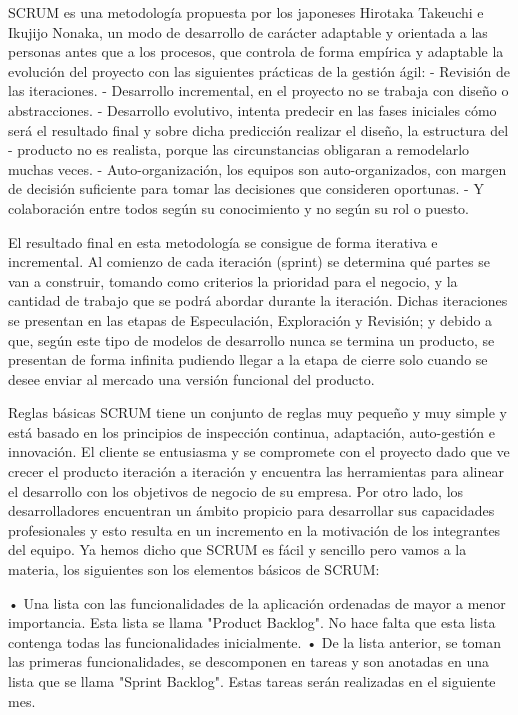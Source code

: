 SCRUM es una metodología propuesta por los japoneses Hirotaka Takeuchi e Ikujijo Nonaka, un modo de desarrollo de carácter adaptable y orientada a las personas antes
que a los procesos, que controla de forma empírica y adaptable la evolución del proyecto con las siguientes prácticas de la gestión ágil:
       - Revisión de las iteraciones.
       - Desarrollo incremental, en el proyecto no se trabaja con diseño o
        abstracciones.
       - Desarrollo evolutivo, intenta predecir en las fases iniciales cómo será el
         resultado final y sobre dicha predicción realizar el diseño, la estructura del
        - producto no es realista, porque las circunstancias obligaran a remodelarlo
          muchas veces.
       - Auto-organización, los equipos son auto-organizados, con margen de decisión
         suficiente para tomar las decisiones que consideren oportunas.
       - Y colaboración entre todos según su conocimiento y no según su rol o puesto.

El resultado final en esta metodología se consigue de forma iterativa e incremental. Al comienzo de cada iteración (sprint) se determina qué partes se van a construir,
tomando como criterios la prioridad para el negocio, y la cantidad de trabajo que se podrá abordar durante la iteración. Dichas iteraciones se presentan en las etapas de
Especulación, Exploración y Revisión; y debido a que, según este tipo de modelos de desarrollo nunca se termina un producto, se presentan de forma infinita pudiendo
llegar a la etapa de cierre solo cuando se desee enviar al mercado una versión funcional del producto.

Reglas básicas
SCRUM tiene un conjunto de reglas muy pequeño y muy simple y está basado en los principios de inspección continua, adaptación, auto-gestión e innovación.
El cliente se entusiasma y se compromete con el proyecto dado que ve crecer el producto iteración a iteración y encuentra las herramientas para alinear el desarrollo
con los objetivos de negocio de su empresa.
Por otro lado, los desarrolladores encuentran un ámbito propicio para desarrollar sus capacidades profesionales y esto resulta en un incremento en la motivación de los
integrantes del equipo.
Ya hemos dicho que SCRUM es fácil y sencillo pero vamos a la materia, los siguientes son los elementos básicos de SCRUM:
    
    •   Una lista con las funcionalidades de la aplicación ordenadas de mayor a menor
        importancia. Esta lista se llama "Product Backlog". No hace falta que esta lista
        contenga todas las funcionalidades inicialmente.
    •   De la lista anterior, se toman las primeras funcionalidades, se descomponen en
        tareas y son anotadas en una lista que se llama "Sprint Backlog". Estas tareas
        serán realizadas en el siguiente mes.


